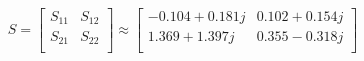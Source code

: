 \[
S = \left[ \begin{array}{cc} 
S_{11} & S_{12} \\ 
 S_{21} & S_{22} \\ 
\end{array} \right] 
 \approx \left[ \begin{array}{cc} 
-0.104 +0.181 j & 0.102 +0.154 j \\ 
1.369 +1.397 j & 0.355 -0.318 j \\ 
\end{array} \right]
\]